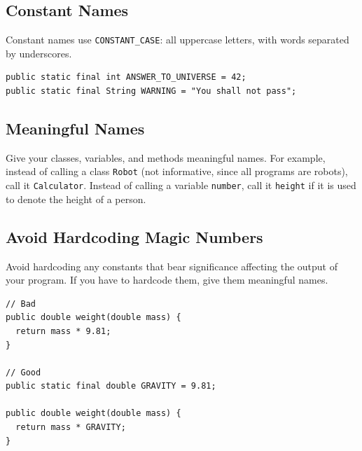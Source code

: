 \documentclass[11pt,DIV=23,landscape]{scrartcl}
\begin{document}
\subsection{Constant Names}\label{constant-names}

\begin{paracol}{2}
\begin{leftcolumn}
Constant names use \lstinline{CONSTANT_CASE}: all uppercase letters, with
words separated by underscores.
\end{leftcolumn}

\begin{rightcolumn}
\begin{lstlisting}
public static final int ANSWER_TO_UNIVERSE = 42;
public static final String WARNING = "You shall not pass";
\end{lstlisting}
\end{rightcolumn}
\end{paracol}

\subsection{Meaningful Names}\label{meaningful-names}

Give your classes, variables, and methods meaningful names. For example,
instead of calling a class \lstinline{Robot} (not informative, since all
programs are robots), call it \lstinline{Calculator}. Instead of calling a
variable \lstinline{number}, call it \lstinline{height} if it is used to
denote the height of a person.

\subsection{Avoid Hardcoding Magic
Numbers}\label{avoid-hardcoding-magic-numbers}

\begin{paracol}{2}
\begin{leftcolumn}
Avoid hardcoding any constants that bear significance affecting the
output of your program. If you have to hardcode them, give them
meaningful names.
\end{leftcolumn}

\begin{rightcolumn}
\begin{lstlisting}
// Bad
public double weight(double mass) {
  return mass * 9.81;
}

// Good
public static final double GRAVITY = 9.81;

public double weight(double mass) {
  return mass * GRAVITY;
}
\end{lstlisting}
\end{rightcolumn}
\end{paracol}
\end{document}
